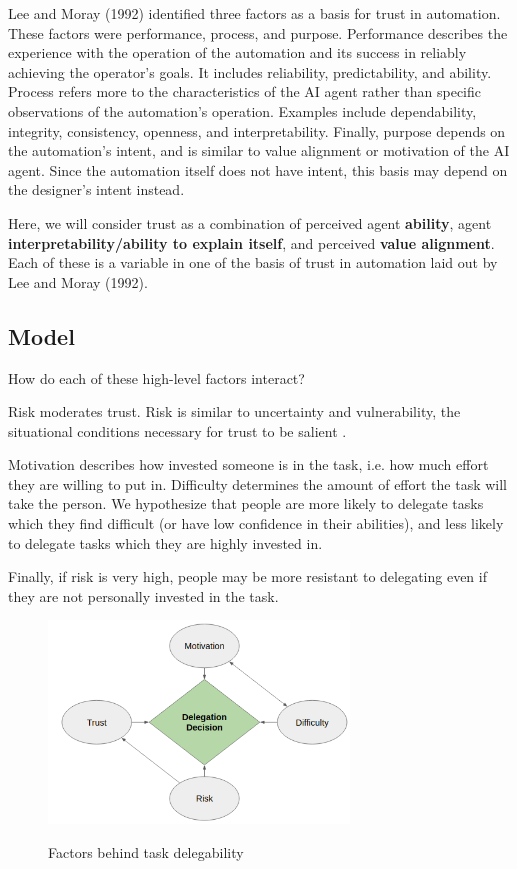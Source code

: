 \documentclass[letterpaper]{article} %
\begin{document}
Lee and Moray (1992) identified three factors as a basis for trust in automation. These factors were performance, process, and purpose. Performance describes the experience with the operation of the automation and its success in reliably achieving the operator's goals. It includes reliability, predictability, and ability. Process refers more to the characteristics of the AI agent rather than specific observations of the automation's operation. Examples include dependability, integrity, consistency, openness, and interpretability. Finally, purpose depends on the automation's intent, and is similar to value alignment or motivation of the AI agent. Since the automation itself does not have intent, this basis may depend on the designer's intent instead.

Here, we will consider trust as a combination of perceived agent \textbf{ability}, agent \textbf{interpretability/ability to explain itself}, and perceived \textbf{value alignment}. Each of these is a variable in one of the basis of trust in automation laid out by Lee and Moray (1992).

\subsection{Model}

How do each of these high-level factors interact?

Risk moderates trust. Risk is similar to uncertainty and vulnerability, the situational conditions necessary for trust to be salient \cite{lee}.

Motivation describes how invested someone is in the task, i.e. how much effort they are willing to put in. Difficulty determines the amount of effort the task will take the person. We hypothesize that people are more likely to delegate tasks which they find difficult (or have low confidence in their abilities), and less likely to delegate tasks which they are highly invested in. 

Finally, if risk is very high, people may be more resistant to delegating even if they are not personally invested in the task.

\begin{figure}[h]
  \centering
  \includegraphics[width=8cm]{model-1.png}
  \label{1}
  \caption{Factors behind task delegability}
\end{figure}
\end{document}
